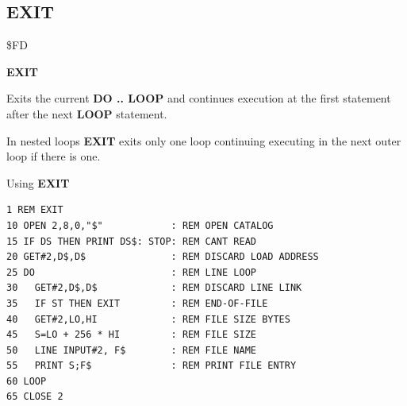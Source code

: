 
\newpage
\subsection{EXIT}
\begin{description}[leftmargin=2cm,style=nextline]
\item [Token:] \$FD
\item [Format:] {\bf EXIT}
\item [Usage:] Exits the current {\bf DO .. LOOP}
               and continues execution at the first
               statement after the next {\bf LOOP} statement.

\item [Remarks:] In nested loops {\bf EXIT} exits only one loop
               continuing executing in the next outer loop
               if there is one.
\item [Example:] Using {\bf EXIT}
\begin{tcolorbox}[colback=black,coltext=white]
\verbatimfont{\codefont}
\begin{verbatim}
1 REM EXIT
10 OPEN 2,8,0,"$"            : REM OPEN CATALOG
15 IF DS THEN PRINT DS$: STOP: REM CANT READ
20 GET#2,D$,D$               : REM DISCARD LOAD ADDRESS
25 DO                        : REM LINE LOOP
30   GET#2,D$,D$             : REM DISCARD LINE LINK
35   IF ST THEN EXIT         : REM END-OF-FILE
40   GET#2,LO,HI             : REM FILE SIZE BYTES
45   S=LO + 256 * HI         : REM FILE SIZE
50   LINE INPUT#2, F$        : REM FILE NAME
55   PRINT S;F$              : REM PRINT FILE ENTRY
60 LOOP
65 CLOSE 2
\end{verbatim}
\end{tcolorbox}
\end{description}


\newpage
